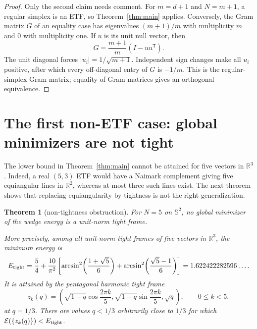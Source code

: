 \documentclass[11pt]{article}
\newtheorem{theorem}{Theorem}
\newcommand{\EE}{\mathcal E}
\begin{document}
\begin{proof}
Only the second claim needs comment.  For $m=d+1$ and $N=m+1$, a regular
simplex is an ETF, so Theorem~\ref{thm:main} applies.  Conversely, the Gram
matrix $G$ of an equality case has eigenvalues $(m+1)/m$ with multiplicity $m$
and $0$ with multiplicity one.  If $u$ is its unit null vector, then
\[
 G=\frac{m+1}{m}(I-uu^{\mathsf T}).
\]
The unit diagonal forces $|u_i|=1/\sqrt{m+1}$.  Independent sign changes make
all $u_i$ positive, after which every off-diagonal entry of $G$ is $-1/m$.
This is the regular-simplex Gram matrix; equality of Gram matrices gives an
orthogonal equivalence.
\end{proof}

\section{The first non-ETF case: global minimizers are not tight}

The lower bound in Theorem~\ref{thm:main} cannot be attained for five vectors
in $\mathbb R^3$.  Indeed, a real $(5,3)$ ETF would have a Naimark complement
giving five equiangular lines in $\mathbb R^2$, whereas at most three such
lines exist.  The next theorem shows that replacing equiangularity by
tightness is not the right generalization.

\begin{theorem}[non-tightness obstruction]\label{thm:nontight}
For $N=5$ on $\mathbb S^2$, no global minimizer of the wedge energy is a
unit-norm tight frame.

More precisely, among all unit-norm tight frames of five vectors in
$\mathbb R^3$, the minimum energy is
\begin{equation}\label{eq:tight-minimum}
 E_{\rm tight}=\frac54+\frac{10}{\pi^2}\left[
 \arcsin^2\!\left(\frac{1+\sqrt5}{6}\right)+
 \arcsin^2\!\left(\frac{\sqrt5-1}{6}\right)\right]
 =1.622422282596\ldots.
\end{equation}
It is attained by the pentagonal harmonic tight frame
\begin{equation}\label{eq:cyclic-frame}
 z_k(q)=\left(\sqrt{1-q}\cos\frac{2\pi k}{5},
 \sqrt{1-q}\sin\frac{2\pi k}{5},\sqrt q\right),
 \qquad 0\le k<5,
\end{equation}
at $q=1/3$.  There are values $q<1/3$ arbitrarily close to $1/3$ for which
$\EE(\{z_k(q)\})<E_{\rm tight}$.
\end{theorem}
\end{document}
